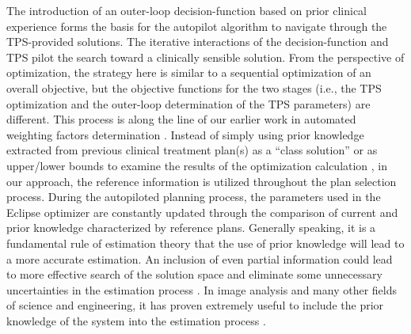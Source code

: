 The introduction of an outer-loop decision-function based on prior clinical experience forms the basis for the autopilot algorithm to navigate through the TPS-provided solutions.  The iterative interactions of the decision-function and TPS pilot the search toward a clinically sensible solution. From the perspective of optimization, the strategy here is similar to a sequential optimization of an overall objective\cite{xing1996, zarepisheh2015}, but the objective functions for the two stages (i.e., the TPS optimization and the outer-loop determination of the TPS parameters) are different. This process is along the line of our earlier work in automated weighting factors determination \cite{yang2004, cotrutz2003, lougovski2010}. Instead of simply using prior knowledge extracted from previous clinical treatment plan(s) as a ``class solution'' or as upper/lower bounds to examine the results of the optimization calculation \cite{schreibmann2004, zhang2011, good2013, moore2015, wu2008, liu2011, wu2013}, in our approach, the reference information is utilized throughout the plan selection process. During the autopiloted planning process, the parameters used in the Eclipse optimizer are constantly updated through the comparison of current and prior knowledge characterized by reference plans. Generally speaking, it is a fundamental rule of estimation theory that the use of prior knowledge will lead to a more accurate estimation. An inclusion of even partial information could lead to more effective search of the solution space and eliminate some unnecessary uncertainties in the estimation process \cite{pugachev2002}. In image analysis and many other fields of science and engineering, it has proven extremely useful to include the prior knowledge of the system into the estimation process \cite{shieh2006, ashburner1997}. 

